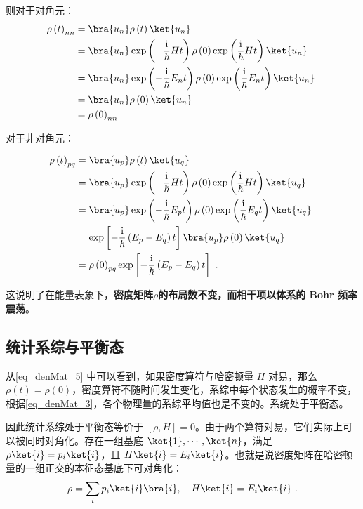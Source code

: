 则对于对角元：
\begin{equation}
\begin{aligned}
\rho\left( t \right)_{nn} &= \bra{u_n}\rho\left( t \right)\ket{u_n}\\
&= \bra{u_n}\exp\left(-\frac{\mathrm{i}}{\hbar}H t\right)\rho\left( 0 \right)\exp\left(\frac{\mathrm{i}}{\hbar}H t\right)\ket{u_n} \\
&=\bra{u_n}\exp\left(-\frac{\mathrm{i}}{\hbar}E_n t\right)  \rho\left( 0 \right)  \exp\left(\frac{\mathrm{i}}{\hbar}E_n t\right)  \ket{u_n} \\
&=\bra{u_n}\rho\left( 0 \right)\ket{u_n} \\
&=\rho\left( 0 \right)_{nn}~.
\end{aligned}~
\end{equation}

对于非对角元：

\begin{equation}
\begin{aligned}
\rho \left( t \right)_{pq} &= \bra{u_p}\rho\left(t\right)\ket{u_q} \\
&= \bra{u_p}\exp\left(-\frac{\mathrm{i}}{\hbar}H t\right)\rho\left(0\right)\exp\left(\frac{\mathrm{i}}{\hbar}H t\right)\ket{u_q} \\
&= \bra{u_p}\exp\left(-\frac{\mathrm{i}}{\hbar}E_p t\right)\rho\left( 0 \right)\exp\left(\frac{\mathrm{i}}{\hbar}E_q t\right)\ket{u_q} \\
&=\exp\left[-\frac{\mathrm{i}}{\hbar}\left(E_p-E_q\right) t\right]\bra{u_p}\rho\left( 0 \right)\ket{u_q} \\
&= \rho \left( 0 \right)_{pq}\exp\left[-\frac{\mathrm{i}}{\hbar}\left(E_p-E_q\right) t\right]~.
\end{aligned}~
\end{equation}

这说明了在能量表象下，\textbf{密度矩阵$\rho$的布局数不变，而相干项以体系的 Bohr 频率震荡}。






\subsection{统计系综与平衡态}
从\autoref{eq_denMat_5} 中可以看到，如果密度算符与哈密顿量 $H$ 对易，那么 $\rho(t)=\rho(0)$，密度算符不随时间发生变化，系综中每个状态发生的概率不变，根据\autoref{eq_denMat_3}，各个物理量的系综平均值也是不变的。系统处于平衡态。

因此统计系综处于平衡态等价于 $[\rho,H]=0$。由于两个算符对易，它们实际上可以被同时对角化。存在一组基底 $\ket{1},\cdots,\ket{n}$，满足 $\rho \ket{i} = p_i \ket{i}$，且 $H\ket{i}=E_i \ket{i}$。也就是说密度矩阵在哈密顿量的一组正交的本征态基底下可对角化：
\begin{equation}
\rho = \sum_i p_i \ket{i}\bra{i},\quad H\ket{i}=E_i \ket{i}~.
\end{equation}



